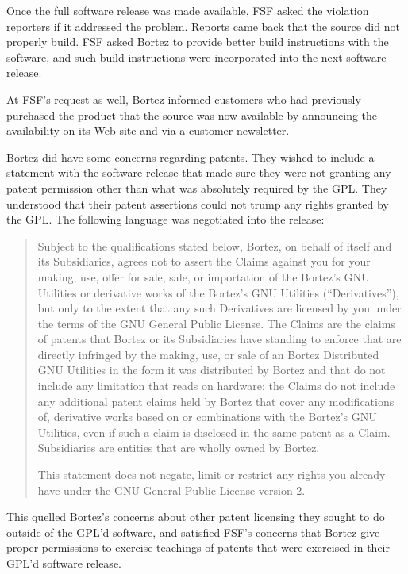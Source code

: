 \label{davrik-build-problems}
Once the full software release was made available, FSF asked the violation
reporters if it addressed the problem. Reports came back that the source
did not properly build. FSF asked Bortez to provide better build
instructions with the software, and such build instructions were
incorporated into the next software release.

At FSF's request as well, Bortez informed customers who had previously
purchased the product that the source was now available by announcing
the availability on its Web site and via a customer newsletter.

Bortez did have some concerns regarding patents. They wished to include a
statement with the software release that made sure they were not granting
any patent permission other than what was absolutely required by the GPL\@.
They understood that their patent assertions could not trump any rights
granted by the GPL\@. The following language was negotiated into the release:

\begin{quotation}
Subject to the qualifications stated below, Bortez, on behalf of itself
and its Subsidiaries, agrees not to assert the Claims against you for your
making, use, offer for sale, sale, or importation of the Bortez's GNU
Utilities or derivative works of the Bortez's GNU Utilities
(``Derivatives''), but only to the extent that any such Derivatives are
licensed by you under the terms of the GNU General Public License. The
Claims are the claims of patents that Bortez or its Subsidiaries have
standing to enforce that are directly infringed by the making, use, or
sale of an Bortez Distributed GNU Utilities in the form it was distributed
by Bortez and that do not include any limitation that reads on hardware;
the Claims do not include any additional patent claims held by Bortez that
cover any modifications of, derivative works based on or combinations with
the Bortez's GNU Utilities, even if such a claim is disclosed in the same
patent as a Claim. Subsidiaries are entities that are wholly owned by
Bortez.

This statement does not negate, limit or restrict any rights you already
have under the GNU General Public License version 2.
\end{quotation}

This quelled Bortez's concerns about other patent licensing they sought to
do outside of the GPL'd software, and satisfied FSF's concerns that Bortez
give proper permissions to exercise teachings of patents that were
exercised in their GPL'd software release.


